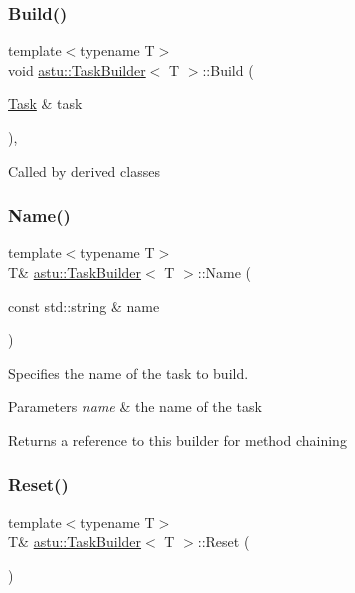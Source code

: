 \subsubsection{\texorpdfstring{Build()}{Build()}}
{\footnotesize\ttfamily template$<$typename T$>$ \\
void \hyperlink{classastu_1_1TaskBuilder}{astu\+::\+Task\+Builder}$<$ T $>$\+::Build (\begin{DoxyParamCaption}\item[{\hyperlink{classastu_1_1Task}{Task} \&}]{task }\end{DoxyParamCaption})\hspace{0.3cm}{\ttfamily [inline]}, {\ttfamily [protected]}}

Called by derived classes \mbox{\label{classastu_1_1TaskBuilder_ab5537f6a3551aaa12378b88cbb402738}} 
\subsubsection{\texorpdfstring{Name()}{Name()}}
{\footnotesize\ttfamily template$<$typename T$>$ \\
T\& \hyperlink{classastu_1_1TaskBuilder}{astu\+::\+Task\+Builder}$<$ T $>$\+::Name (\begin{DoxyParamCaption}\item[{const std\+::string \&}]{name }\end{DoxyParamCaption})\hspace{0.3cm}{\ttfamily [inline]}}

Specifies the name of the task to build.


\begin{DoxyParams}{Parameters}
{\em name} & the name of the task \\
\hline
\end{DoxyParams}
\begin{DoxyReturn}{Returns}
a reference to this builder for method chaining 
\end{DoxyReturn}
\mbox{\label{classastu_1_1TaskBuilder_ad55c0a226930055fce5c50e6a8ed0325}} 
\subsubsection{\texorpdfstring{Reset()}{Reset()}}
{\footnotesize\ttfamily template$<$typename T$>$ \\
T\& \hyperlink{classastu_1_1TaskBuilder}{astu\+::\+Task\+Builder}$<$ T $>$\+::Reset (\begin{DoxyParamCaption}{ }\end{DoxyParamCaption})\hspace{0.3cm}{\ttfamily [inline]}}

